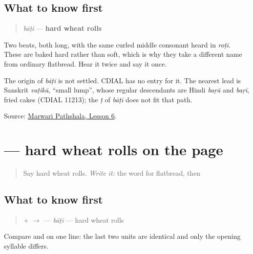 \subsection*{What to know first}
\begin{quote}
\emph{bāṭī} — \textbf{hard wheat rolls}
\end{quote}

Two beats, both long, with the same curled middle consonant heard in \emph{roṭī}. These are baked hard rather than soft, which is why they take a different name from ordinary flatbread. Hear it twice and say it once.

\begin{cousinweb}
The origin of \emph{bāṭī} is not settled. CDIAL has no entry for it. The nearest lead is Sanskrit \emph{vaṭikā}, \textquotedblleft{}small lump\textquotedblright{}, whose regular descendants are Hindi \emph{baṛā} and \emph{baṛī}, fried cakes (CDIAL 11213); the \emph{ṭ} of \emph{bāṭī} does not fit that path.
\end{cousinweb}

\begin{tcolorbox}[breakable,colback=teal!4,colframe=teal!35!black,title={Before you move on}]
Source: \href{https://www.marwaripathshala.com/marwari-lesson-6-english}{Marwari Pathshala, Lesson 6}.
\end{tcolorbox}
\section[\texorpdfstring{\mw{बाटी} (bāṭī)}{बाटी (bāṭī)}]{ — hard wheat rolls on the page}

\label{lesson:MW-C19-baati}



\begin{quote}
Say hard wheat rolls. \emph{Write it:} the word for flatbread, then \textbf{}
\end{quote}

\subsection*{What to know first}
\begin{quote}
\textbf{} + \textbf{} $\to$ \textbf{} — \emph{bāṭī} — hard wheat rolls
\end{quote}

Compare \textbf{} and \textbf{} on one line: the last two units are identical and only the opening syllable differs.

